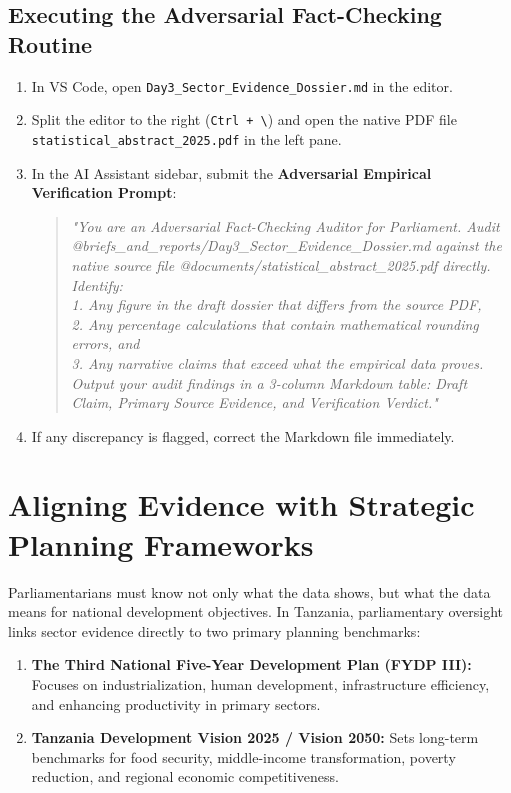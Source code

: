 \documentclass[11pt, a4paper]{report}
\begin{document}
\subsection{Executing the Adversarial Fact-Checking Routine}
\begin{enumerate}[label=\textbf{Step \arabic*:}]
    \item In VS Code, open \texttt{Day3\_Sector\_Evidence\_Dossier.md} in the editor.
    \item Split the editor to the right (\texttt{Ctrl + \textbackslash}) and open the native PDF file \texttt{statistical\_abstract\_2025.pdf} in the left pane.
    \item In the AI Assistant sidebar, submit the \textcolor{suagreen}{\textbf{Adversarial Empirical Verification Prompt}}:
    \begin{quote}
        \small\textit{"You are an Adversarial Fact-Checking Auditor for Parliament. Audit @briefs\_and\_reports/Day3\_Sector\_Evidence\_Dossier.md against the native source file @documents/statistical\_abstract\_2025.pdf directly. \\
        Identify: \\
        1. Any figure in the draft dossier that differs from the source PDF, \\
        2. Any percentage calculations that contain mathematical rounding errors, and \\
        3. Any narrative claims that exceed what the empirical data proves. \\
        Output your audit findings in a 3-column Markdown table: Draft Claim, Primary Source Evidence, and Verification Verdict."}
    \end{quote}
    \item If any discrepancy is flagged, correct the Markdown file immediately.
\end{enumerate}

\section{Aligning Evidence with Strategic Planning Frameworks}
Parliamentarians must know not only what the data shows, but what the data means for national development objectives. In Tanzania, parliamentary oversight links sector evidence directly to two primary planning benchmarks:
\begin{enumerate}
    \item \textbf{The Third National Five-Year Development Plan (FYDP III):} Focuses on industrialization, human development, infrastructure efficiency, and enhancing productivity in primary sectors.
    \item \textbf{Tanzania Development Vision 2025 / Vision 2050:} Sets long-term benchmarks for food security, middle-income transformation, poverty reduction, and regional economic competitiveness.
\end{enumerate}
\end{document}
